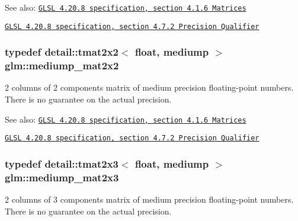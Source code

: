 \begin{Desc}
\item[See also:]\href{http://www.opengl.org/registry/doc/GLSLangSpec.4.20.8.pdf}{\tt GLSL 4.20.8 specification, section 4.1.6 Matrices} 

\href{http://www.opengl.org/registry/doc/GLSLangSpec.4.20.8.pdf}{\tt GLSL 4.20.8 specification, section 4.7.2 Precision Qualifier} \end{Desc}
\hypertarget{group__core__precision_g867b486aea2d228a1e1a134af73b2c4b}{
\subsubsection[mediump\_\-mat2x2]{\setlength{\rightskip}{0pt plus 5cm}typedef detail::tmat2x2$<$ float, mediump $>$ {\bf glm::mediump\_\-mat2x2}}}
\label{group__core__precision_g867b486aea2d228a1e1a134af73b2c4b}


2 columns of 2 components matrix of medium precision floating-point numbers. There is no guarantee on the actual precision.

\begin{Desc}
\item[See also:]\href{http://www.opengl.org/registry/doc/GLSLangSpec.4.20.8.pdf}{\tt GLSL 4.20.8 specification, section 4.1.6 Matrices} 

\href{http://www.opengl.org/registry/doc/GLSLangSpec.4.20.8.pdf}{\tt GLSL 4.20.8 specification, section 4.7.2 Precision Qualifier} \end{Desc}
\hypertarget{group__core__precision_gd4e099c0dfa8f35ce9c0ddc8605428cf}{
\subsubsection[mediump\_\-mat2x3]{\setlength{\rightskip}{0pt plus 5cm}typedef detail::tmat2x3$<$ float, mediump $>$ {\bf glm::mediump\_\-mat2x3}}}
\label{group__core__precision_gd4e099c0dfa8f35ce9c0ddc8605428cf}


2 columns of 3 components matrix of medium precision floating-point numbers. There is no guarantee on the actual precision.


